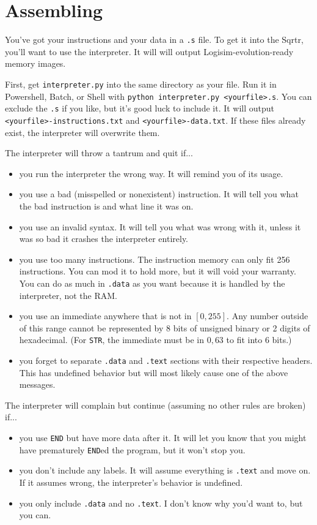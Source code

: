 \documentclass[12pt, oneside]{memoir}
\newcommand{\instruction}[1]{{\color{instruction}\texttt{#1}}}
\newcommand{\header}[1]{{\color{header}\texttt{#1}}}
\begin{document}
\chapter{Assembling}
You've got your instructions and your data in a \texttt{.s} file. To get it into the Sqrtr, you'll want to use the interpreter. It will will output Logisim-evolution-ready memory images. 

First, get \texttt{interpreter.py} into the same directory as your file. Run it in Powershell, Batch, or Shell with \texttt{python interpreter.py <yourfile>.s}. You can exclude the \texttt{.s} if you like, but it's good luck to include it. It will output \texttt{<yourfile>-instructions.txt} and \texttt{<yourfile>-data.txt}. If these files already exist, the interpreter will overwrite them.

The interpreter will throw a tantrum and quit if...
\begin{itemize}
    \item you run the interpreter the wrong way. It will remind you of its usage.
    \item you use a bad (misspelled or nonexistent) instruction. It will tell you what the bad instruction is and what line it was on.
    \item you use an invalid syntax. It will tell you what was wrong with it, unless it was so bad it crashes the interpreter entirely.
    \item you use too many instructions. The instruction memory can only fit 256 instructions. You can mod it to hold more, but it will void your warranty. You can do as much in \header{.data} as you want because it is handled by the interpreter, not the RAM.
    \item you use an immediate anywhere that is not in $[0,255]$. Any number outside of this range cannot be represented by 8 bits of unsigned binary or 2 digits of hexadecimal. (For \instruction{STR}, the immediate must be in $0,63$ to fit into 6 bits.)
    \item you forget to separate \header{.data} and \header{.text} sections with their respective headers. This has undefined behavior but will most likely cause one of the above messages.
\end{itemize}

The interpreter will complain but continue (assuming no other rules are broken) if...
\begin{itemize}
    \item you use \instruction{END} but have more data after it. It will let you know that you might have prematurely \instruction{END}ed the program, but it won't stop you.
    \item you don't include any labels. It will assume everything is \header{.text} and move on. If it assumes wrong, the interpreter's behavior is undefined.
    \item you only include \header{.data} and no \header{.text}. I don't know why you'd want to, but you can.
\end{itemize}
\end{document}

